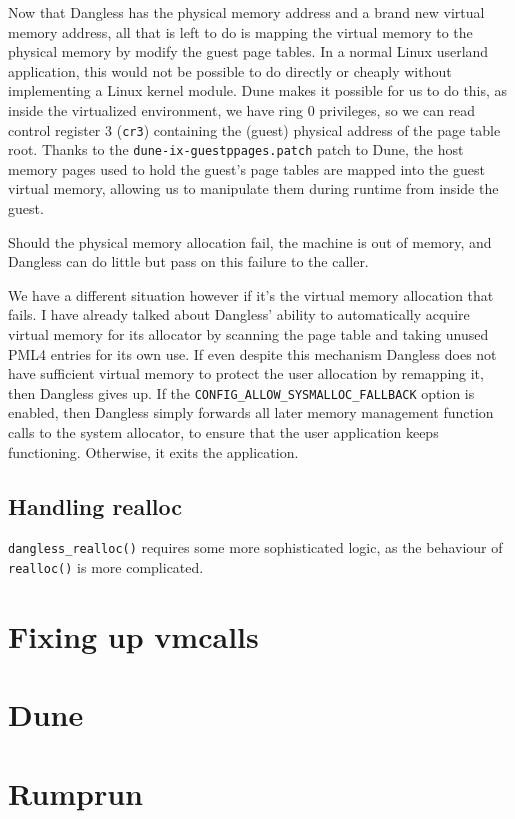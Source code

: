 Now that Dangless has the physical memory address and a brand new virtual memory address, all that is left to do is mapping the virtual memory to the physical memory by modify the guest page tables. In a normal Linux userland application, this would not be possible to do directly or cheaply without implementing a Linux kernel module. Dune makes it possible for us to do this, as inside the virtualized environment, we have ring 0 privileges, so we can read control register 3 (\lstinline!cr3!) containing the (guest) physical address of the page table root. Thanks to the \texttt{dune-ix-guestppages.patch} patch to Dune, the host memory pages used to hold the guest's page tables are mapped into the guest virtual memory, allowing us to manipulate them during runtime from inside the guest.

Should the physical memory allocation fail, the machine is out of memory, and Dangless can do little but pass on this failure to the caller.

We have a different situation however if it's the virtual memory allocation that fails. I have already talked about Dangless' ability to automatically acquire virtual memory for its allocator by scanning the page table and taking unused PML4 entries for its own use. If even despite this mechanism Dangless does not have sufficient virtual memory to protect the user allocation by remapping it, then Dangless gives up. If the \lstinline!CONFIG_ALLOW_SYSMALLOC_FALLBACK! option is enabled, then Dangless simply forwards all later memory management function calls to the system allocator, to ensure that the user application keeps functioning. Otherwise, it exits the application.

\subsection{Handling realloc}

\lstinline!dangless_realloc()! requires some more sophisticated logic, as the behaviour of \lstinline!realloc()! is more complicated. 

\section{Fixing up vmcalls}


\section{Dune}



\section{Rumprun}

